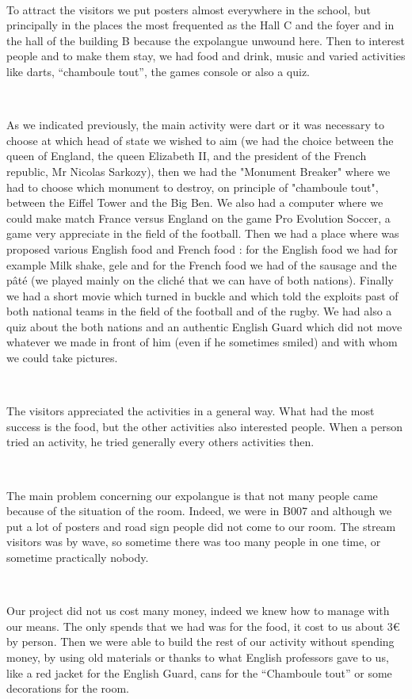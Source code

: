 \documentclass[11pt;a4paper]{report}
\begin{document}
~

To attract the visitors we put posters almost everywhere in the school, but principally in the places the most frequented as the Hall C and the foyer and in the hall of the building B because the expolangue unwound here. Then to interest people and to make them stay, we had food and drink, music and varied activities like darts, “chamboule tout”, the games console or also a quiz.

~

As we indicated previously, the main activity were dart or it was necessary to choose at which head of state we wished to aim (we had the choice between the queen of England, the queen Elizabeth II, and the president of the French republic, Mr Nicolas Sarkozy), then we had the "Monument Breaker" where we had to choose which monument to destroy, on principle of "chamboule tout", between the Eiffel Tower and the Big Ben. We also had a computer where we could make match France versus England on the game Pro Evolution Soccer, a game very appreciate in the field of the football. Then we had a place where was proposed various English food and French food : for the English food we had for example Milk shake, gele and for the French food we had of the sausage and the pâté (we played mainly on the cliché that we can have of both nations). Finally we had a short movie which turned in buckle and which told the exploits past of both national teams in the field of the football and of the rugby. We had also a quiz about the both nations and an authentic English Guard which did not move whatever we made in front of him (even if he sometimes smiled) and with whom we could take pictures.

~

The visitors appreciated the activities in a general way. What had the most success is the food, but the other activities also interested people. When a person tried an activity, he tried generally every others activities then.

~

The main problem concerning our expolangue is that not many people came because of the situation of the room. Indeed, we were in B007 and although we put a lot of posters and road sign people did not come to our room. The stream visitors was by wave, so sometime there was too many people in one time, or sometime practically nobody.

~

Our project did not us cost many money, indeed we knew how to manage with our means. The only spends that we had was for the food, it cost to us about 3\euro{} by person. Then we were able to build the rest of our activity without spending money, by using old materials or thanks to what English professors gave to us, like a red jacket for the English Guard, cans for the “Chamboule tout” or some decorations for the room. 
\end{document}
